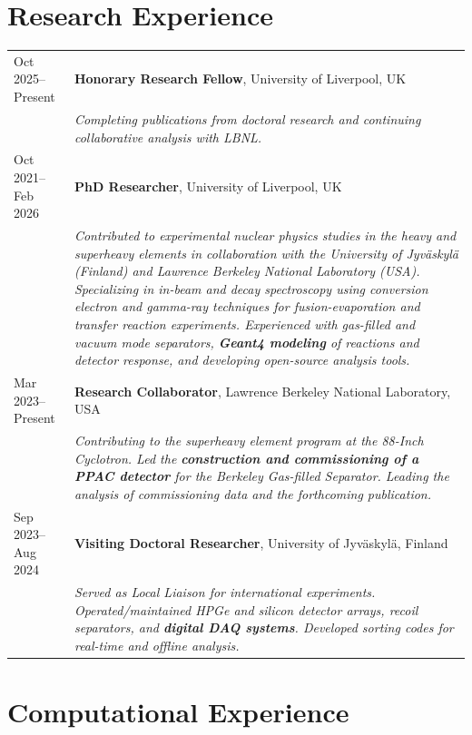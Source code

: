 \documentclass[a4paper,11pt]{article}
\begin{document}
\section{Research Experience}
\begin{tabularx}{\linewidth}{@{}l X@{}}
Oct 2025--Present & \textbf{Honorary Research Fellow}, University of Liverpool, UK \\
& \emph{Completing publications from doctoral research and continuing collaborative analysis with LBNL.} \\[4pt]

Oct 2021--Feb 2026 & \textbf{PhD Researcher}, University of Liverpool, UK \\
& \emph{Contributed to experimental nuclear physics studies in the heavy and superheavy elements in collaboration with the University of Jyväskylä (Finland) and Lawrence Berkeley National Laboratory (USA). Specializing in in-beam and decay spectroscopy using conversion electron and gamma-ray techniques for fusion-evaporation and transfer reaction experiments. Experienced with gas-filled and vacuum mode separators, \textbf{Geant4 modeling} of reactions and detector response, and developing open-source analysis tools.} \\[4pt]

Mar 2023--Present & \textbf{Research Collaborator}, Lawrence Berkeley National Laboratory, USA \\
& \emph{Contributing to the superheavy element program at the 88-Inch Cyclotron. Led the \textbf{construction and commissioning of a PPAC detector} for the Berkeley Gas-filled Separator. Leading the analysis of commissioning data and the forthcoming publication.} \\[4pt]

Sep 2023--Aug 2024 & \textbf{Visiting Doctoral Researcher}, University of Jyv\"{a}skyl\"{a}, Finland \\
& \emph{Served as Local Liaison for international experiments. Operated/maintained HPGe and silicon detector arrays, recoil separators, and \textbf{digital DAQ systems}. Developed sorting codes for real-time and offline analysis.}
\end{tabularx}

\section{Computational Experience}
\end{document}
